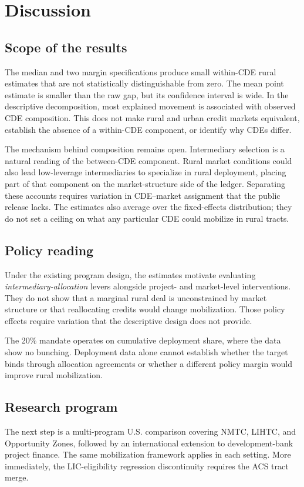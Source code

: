 \section{Discussion}\label{sec:discussion}

\subsection{Scope of the results}

The median and two margin specifications produce small within-CDE rural
estimates that are not statistically distinguishable from zero. The mean
point estimate is smaller than the raw gap, but its confidence interval is
wide. In the descriptive decomposition, most explained movement is
associated with observed CDE composition. This does not make rural and urban
credit markets equivalent, establish the absence of a within-CDE component,
or identify why CDEs differ.

The mechanism behind composition remains open. Intermediary selection is a
natural reading of the between-CDE component. Rural market conditions could
also lead low-leverage intermediaries to specialize in rural deployment,
placing part of that component on the market-structure side of the ledger.
Separating these accounts requires variation in CDE--market assignment that
the public release lacks. The estimates also average over the fixed-effects
distribution; they do not set a ceiling on what any particular CDE could
mobilize in rural tracts.

\subsection{Policy reading}

Under the existing program design, the estimates motivate evaluating
\emph{intermediary-allocation} levers alongside project- and market-level
interventions. They do not show that a marginal rural deal is unconstrained
by market structure or that reallocating credits would change mobilization.
Those policy effects require variation that the descriptive design does not
provide.

The 20\% mandate operates on cumulative deployment share, where the data
show no bunching. Deployment data alone cannot establish whether the target
binds through allocation agreements or whether a different policy margin
would improve rural mobilization.

\subsection{Research program}

The next step is a multi-program U.S. comparison covering NMTC, LIHTC, and
Opportunity Zones, followed by an international extension to
development-bank project finance. The same mobilization framework applies
in each setting. More immediately, the LIC-eligibility regression
discontinuity requires the ACS tract merge.
